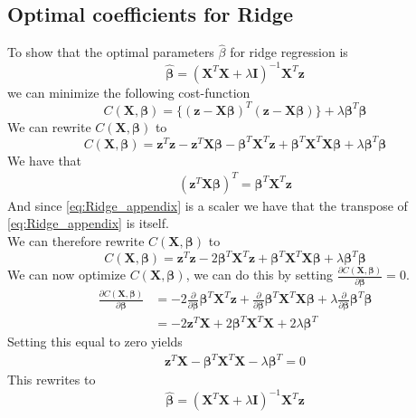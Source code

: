 \documentclass{article}
\begin{document}
\subsection{Optimal coefficients for Ridge}
\label{app_derivations:beta_ridge_without_svd}
To show that the optimal parameters $\hat{\beta}$ for 
ridge regression is 
$$\bm{\hat{\beta}} = (\mathbf{X}^{T}\mathbf{X} + \lambda\mathbf{I})^{-1}\mathbf{X}^{T}\bm{z}$$ 
we can minimize the following cost-function
$$C(\mathbf{X}, \bm{\beta}) = \{(\bm{z} - \mathbf{X}\bm{\beta})^{T}(\bm{z} - \mathbf{X}\bm{\beta})\} + \lambda\bm{\beta}^{T}\bm{\beta}$$
We can rewrite $C(\mathbf{X}, \bm{\beta})$ to 
$$C(\mathbf{X}, \bm{\beta}) = \bm{z}^{T}\bm{z} - \bm{z}^{T}\mathbf{X}\bm{\beta} - \bm{\beta}^{T}\mathbf{X}^{T}\bm{z} + \bm{\beta}^{T}\mathbf{X}^{T}\mathbf{X}\bm{\beta} + \lambda\bm{\beta}^{T}\bm{\beta}$$
We have that
\begin{align} \label{eq:Ridge_appendix}
    (\bm{z}^{T}\mathbf{X}\bm{\beta})^{T} = \bm{\beta}^{T}\mathbf{X}^{T}\bm{z}  
\end{align}
And since \ref{eq:Ridge_appendix} is a scaler we have that the transpose of \ref{eq:Ridge_appendix} is itself. \\
We can therefore rewrite $C(\mathbf{X}, \bm{\beta})$ to
$$C(\mathbf{X}, \bm{\beta}) = \bm{z}^{T}\bm{z} - 2\bm{\beta}^{T}\mathbf{X}^{T}\bm{z} + \bm{\beta}^{T}\mathbf{X}^{T}\mathbf{X}\bm{\beta} + \lambda\bm{\beta}^{T}\bm{\beta}$$
We can now optimize $C(\mathbf{X}, \bm{\beta})$, we can do this by setting $\frac{\partial C(\mathbf{X}, \bm{\beta})}{\partial \bm{\beta}} = 0.$
\begin{align*}
    \frac{\partial C(\mathbf{X}, \bm{\beta})}{\partial \bm{\beta}} &= -2\frac{\partial}{\partial\bm{\beta}}  \bm{\beta}^{T}\mathbf{X}^{T}\bm{z} +  \frac{\partial}{\partial \bm{\beta}} \bm{\beta}^{T}\mathbf{X}^{T}\mathbf{X}\bm{\beta} + \lambda \frac{\partial}{\partial \bm{\beta}} \bm{\beta}^T\bm{\beta} \\
    &= -2\bm{z}^{T}\mathbf{X} + 2\bm{\beta}^{T}\mathbf{X}^{T}\mathbf{X} + 2 \lambda \bm{\beta}^{T}
\end{align*}
Setting this equal to zero yields
\begin{align*}
    \bm{z}^{T}\mathbf{X} - \bm{\beta}^{T}\mathbf{X}^{T}\mathbf{X} - \lambda \bm{\beta}^{T} = 0
\end{align*}
This rewrites to
$$\bm{\hat{\beta}} = (\mathbf{X}^{T}\mathbf{X} + \lambda\mathbf{I})^{-1}\mathbf{X}^{T}\bm{z}$$ 
\end{document}
